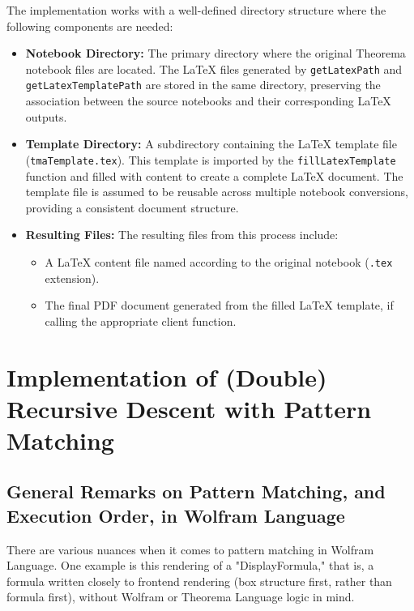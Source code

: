 The implementation works with a well-defined directory structure where the following components are needed:

\begin{itemize}
    \item \textbf{Notebook Directory:} The primary directory where the original Theorema notebook files are located. The LaTeX files generated by \texttt{getLatexPath} and \texttt{getLatexTemplatePath} are stored in the same directory, preserving the association between the source notebooks and their corresponding LaTeX outputs.

    \item \textbf{Template Directory:} A subdirectory containing the LaTeX template file (\texttt{tmaTemplate.tex}). This template is imported by the \texttt{fillLatexTemplate} function and filled with content to create a complete LaTeX document. The template file is assumed to be reusable across multiple notebook conversions, providing a consistent document structure.

    \item \textbf{Resulting Files:} The resulting files from this process include:
    \begin{itemize}
        \item A LaTeX content file named according to the original notebook (\texttt{.tex} extension).
        \item The final PDF document generated from the filled LaTeX template, if calling the appropriate client function.
    \end{itemize}
\end{itemize}

\section{Implementation of (Double) Recursive Descent with Pattern Matching} \label{pattern-matching-implementation}

\subsection{General Remarks on Pattern Matching, and Execution Order, in Wolfram Language}

There are various nuances when it comes to pattern matching in Wolfram Language. One example is this rendering of a "DisplayFormula," that is, a formula written closely to frontend rendering (box structure first, rather than formula first), without Wolfram or Theorema Language logic in mind.

